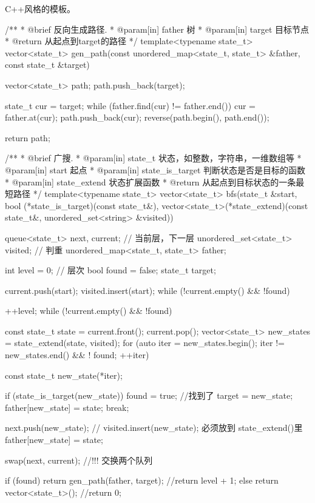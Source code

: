 C++风格的模板。
\begin{Codex}[label=bfs_template1.cpp]
/**
 * @brief 反向生成路径.
 * @param[in] father 树
 * @param[in] target 目标节点
 * @return 从起点到target的路径
 */
template<typename state_t>
vector<state_t> gen_path(const unordered_map<state_t, state_t> &father,
        const state_t &target) {
    vector<state_t> path;
    path.push_back(target);

    state_t cur = target;
    while (father.find(cur) != father.end()) {
        cur = father.at(cur);
        path.push_back(cur);
    }
    reverse(path.begin(), path.end());

    return path;
}

/**
 * @brief 广搜.
 * @param[in] state_t 状态，如整数，字符串，一维数组等
 * @param[in] start 起点
 * @param[in] state_is_target 判断状态是否是目标的函数
 * @param[in] state_extend 状态扩展函数
 * @return 从起点到目标状态的一条最短路径
 */
template<typename state_t>
vector<state_t> bfs(state_t &start, bool (*state_is_target)(const state_t&),
        vector<state_t>(*state_extend)(const state_t&,
                unordered_set<string> &visited)) {
    queue<state_t> next, current; // 当前层，下一层
    unordered_set<state_t> visited; // 判重
    unordered_map<state_t, state_t> father;

    int level = 0;  // 层次
    bool found = false;
    state_t target;

    current.push(start);
    visited.insert(start);
    while (!current.empty() && !found) {
        ++level;
        while (!current.empty() && !found) {
            const state_t state = current.front();
            current.pop();
            vector<state_t> new_states = state_extend(state, visited);
            for (auto iter = new_states.begin();
                    iter != new_states.end() && ! found; ++iter) {
                const state_t new_state(*iter);

                if (state_is_target(new_state)) {
                    found = true; //找到了
                    target = new_state;
                    father[new_state] = state;
                    break;
                }

                next.push(new_state);
                // visited.insert(new_state); 必须放到 state_extend()里
                father[new_state] = state;
            }
        }
        swap(next, current); //!!! 交换两个队列
    }

    if (found) {
        return gen_path(father, target);
        //return level + 1;
    } else {
        return vector<state_t>();
        //return 0;
    }
}
\end{Codex}

